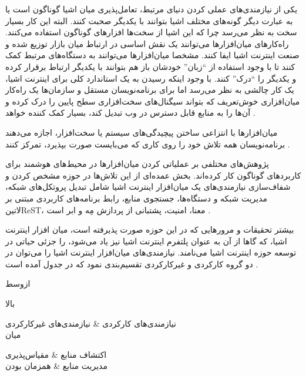 
یکی از نیازمندی‌های عملی کردن دنیای مرتبط، تعامل‌پذیری میان اشیا گوناگون است یا به عبارت دیگر گونه‌های مختلف اشیا بتوانند با یکدیگر صحبت کنند.
البته این کار بسیار سخت به نظر می‌رسد چرا که این اشیا از سخت‌ها افزارهای گوناگون استفاده می‌کنند.
راه‌کارهای میان‌افزارها می‌توانند یک نقش اساسی در ارتباط میان بازار توزیع شده و صنعت اینترنت اشیا ایفا کنند.
مشخصا میان‌افزارها می‌توانند به دستگاه‌های مرتبط کمک کنند تا با وجود استفاده از ``زبان'' خودشان باز هم بتوانند با یکدیگر ارتباط برقرار کرده و یکدیگر را ``درک'' کنند.
با وجود اینکه رسیدن به یک استاندارد کلی برای اینترنت اشیا، یک کار چالشی به نظر می‌رسد اما برای برنامه‌نویسان مستقل و سازمان‌ها یک راه‌کار میان‌افزاری خوش‌تعریف
که بتواند سیگنال‌های سخت‌افزاری سطح پایین را درک کرده و آن‌ها را به منابع قابل دسترس در وب تبدیل کند،
بسیار کمک کننده خواهد
.

میان‌افزارها با انتزاعی ساختن پیچیدگی‌های سیستم یا سخت‌افزار، اجازه می‌دهند برنامه‌نویسان همه تلاش خود را روی کاری که می‌بایست صورت بپذیرد، تمرکز کنند
.

پژوهش‌های مختلفی بر عملیاتی کردن میان‌افزارها در محیط‌های هوشمند برای کاربردهای گوناگون کار کرده‌اند.
بخش عمده‌ای از این تلاش‌ها در حوزه مشخص کردن و شفاف‌سازی نیازمندی‌های یک میان‌افزار اینترنت اشیا شامل
تبدیل پروتکل‌های شبکه، مدیریت شبکه و دستگاه‌ها، جستجوی منابع، رابط برنامه‌های کاربردی مبتنی بر ‌لاتین{ReST}، معنا، امنیت، پشتبانی از پردازش مِه و ابر است
.

بیشتر تحقیقات و مرورهایی که در این حوزه صورت پذیرفته است، میان افزار اینترنت اشیا، که گاها از آن به عنوان پلتفرم اینترنت اشیا نیز یاد می‌شود، را جزئی حیاتی در
توسعه حوزه اینترنت اشیا می‌نامند. نیازمندی‌های میان‌افزار اینترنت اشیا را می‌توان در دو گروه کارکردی و غیرکارکردی تقسیم‌بندی نمود که در جدول 
آمده است
.


‌ازوسط

‌بالا

نیازمندی‌های کارکردی &
نیازمندی‌های غیرکارکردی \\

‌میان

اکتشاف منابع &
مقیاس‌پذیری \\

مدیریت منابع &
همزمان بودن \\


